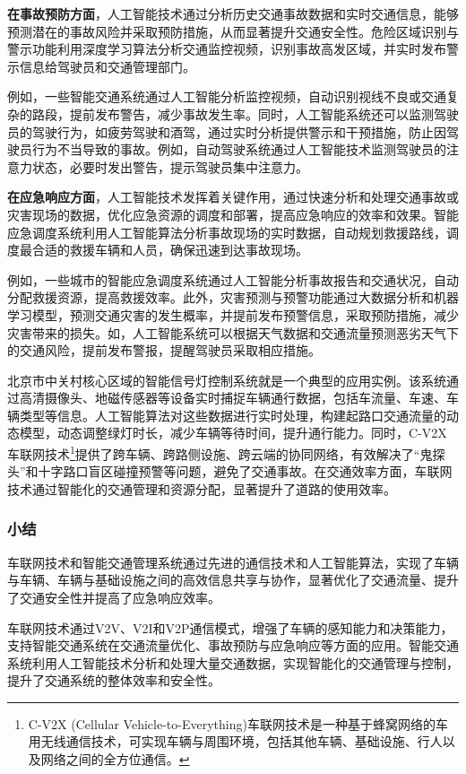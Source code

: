 \textbf{在事故预防方面}，人工智能技术通过分析历史交通事故数据和实时交通信息，能够预测潜在的事故风险并采取预防措施，从而显著提升交通安全性。危险区域识别与警示功能利用深度学习算法分析交通监控视频，识别事故高发区域，并实时发布警示信息给驾驶员和交通管理部门。

例如，一些智能交通系统通过人工智能分析监控视频，自动识别视线不良或交通复杂的路段，提前发布警告，减少事故发生率。同时，人工智能系统还可以监测驾驶员的驾驶行为，如疲劳驾驶和酒驾，通过实时分析提供警示和干预措施，防止因驾驶员行为不当导致的事故。例如，自动驾驶系统通过人工智能技术监测驾驶员的注意力状态，必要时发出警告，提示驾驶员集中注意力。

\textbf{在应急响应方面}，人工智能技术发挥着关键作用，通过快速分析和处理交通事故或灾害现场的数据，优化应急资源的调度和部署，提高应急响应的效率和效果。智能应急调度系统利用人工智能算法分析事故现场的实时数据，自动规划救援路线，调度最合适的救援车辆和人员，确保迅速到达事故现场。

例如，一些城市的智能应急调度系统通过人工智能分析事故报告和交通状况，自动分配救援资源，提高救援效率。此外，灾害预测与预警功能通过大数据分析和机器学习模型，预测交通灾害的发生概率，并提前发布预警信息，采取预防措施，减少灾害带来的损失。如，人工智能系统可以根据天气数据和交通流量预测恶劣天气下的交通风险，提前发布警报，提醒驾驶员采取相应措施。

北京市中关村核心区域的智能信号灯控制系统就是一个典型的应用实例。该系统通过高清摄像头、地磁传感器等设备实时捕捉车辆通行数据，包括车流量、车速、车辆类型等信息。人工智能算法对这些数据进行实时处理，构建起路口交通流量的动态模型，动态调整绿灯时长，减少车辆等待时间，提升通行能力。同时，C-V2X车联网技术\footnote{C-V2X (Cellular Vehicle-to-Everything)车联网技术是一种基于蜂窝网络的车用无线通信技术，可实现车辆与周围环境，包括其他车辆、基础设施、行人以及网络之间的全方位通信。}提供了跨车辆、跨路侧设施、跨云端的协同网络，有效解决了“鬼探头”和十字路口盲区碰撞预警等问题，避免了交通事故。在交通效率方面，车联网技术通过智能化的交通管理和资源分配，显著提升了道路的使用效率。

\subsubsection{小结}

车联网技术和智能交通管理系统通过先进的通信技术和人工智能算法，实现了车辆与车辆、车辆与基础设施之间的高效信息共享与协作，显著优化了交通流量、提升了交通安全性并提高了应急响应效率。

车联网技术通过V2V、V2I和V2P通信模式，增强了车辆的感知能力和决策能力，支持智能交通系统在交通流量优化、事故预防与应急响应等方面的应用。智能交通系统利用人工智能技术分析和处理大量交通数据，实现智能化的交通管理与控制，提升了交通系统的整体效率和安全性。

